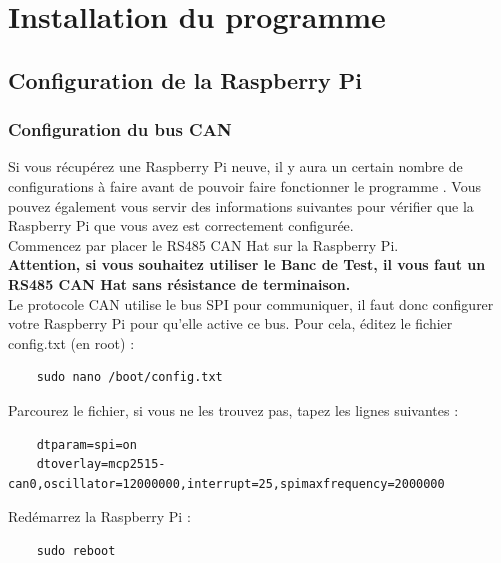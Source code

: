 \section{Installation du programme {\nomLogiciel}}

\subsection{Configuration de la Raspberry Pi}
\subsubsection{Configuration du bus CAN}
Si vous récupérez une Raspberry Pi neuve, il y aura un certain nombre de configurations à faire avant de pouvoir faire fonctionner le programme {\nomLogiciel}. Vous pouvez également vous servir des informations suivantes pour vérifier que la Raspberry Pi que vous avez est correctement configurée.\\

Commencez par placer le RS485 CAN Hat sur la Raspberry Pi. \\

\textbf{Attention, si vous souhaitez utiliser le Banc de Test, il vous faut un RS485 CAN Hat sans résistance de terminaison.}\\

Le protocole CAN utilise le bus SPI pour communiquer, il faut donc configurer votre Raspberry Pi pour qu'elle active ce bus.
Pour cela, éditez le fichier config.txt (en root) :
\vspace{-1.8\baselineskip} 
\begin{lstlisting}
    sudo nano /boot/config.txt
\end{lstlisting} 
Parcourez le fichier, si vous ne les trouvez pas, tapez les lignes suivantes :
\vspace{-1.8\baselineskip} 
\begin{lstlisting}
    dtparam=spi=on
    dtoverlay=mcp2515-can0,oscillator=12000000,interrupt=25,spimaxfrequency=2000000
\end{lstlisting}
Redémarrez la Raspberry Pi :
\vspace{-1.8\baselineskip} 
\begin{lstlisting}
    sudo reboot
\end{lstlisting}

